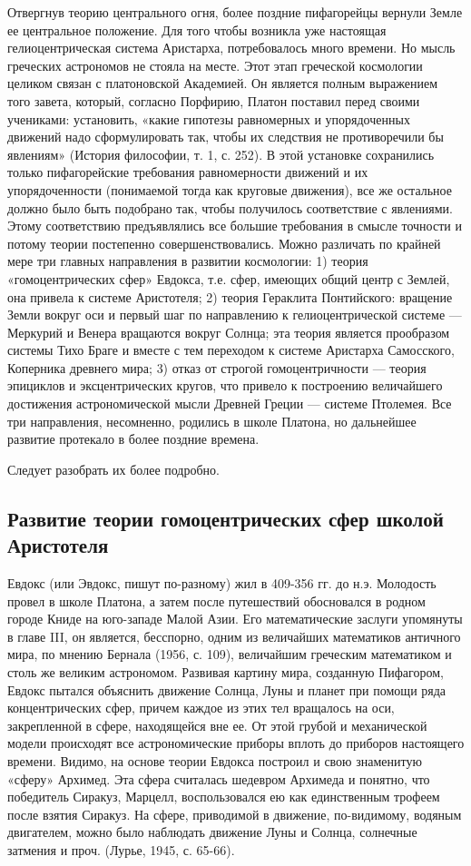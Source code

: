 Отвергнув теорию центрального огня, более поздние пифагорейцы вернули
Земле ее центральное положение. Для того чтобы возникла уже настоящая
гелиоцентрическая система Аристарха, потребовалось много времени. Но
мысль греческих астрономов не стояла на месте. Этот этап греческой
космологии целиком связан с платоновской Академией. Он является полным
выражением того завета, который, согласно Порфирию, Платон поставил
перед своими учениками: установить, «какие гипотезы равномерных и
упорядоченных движений надо сформулировать так, чтобы их следствия не
противоречили бы явлениям» (История философии, т. 1, с. 252). В этой
установке сохранились только пифагорейские требования равномерности
движений и их упорядоченности (понимаемой тогда как круговые
движения), все же остальное должно было быть подобрано так, чтобы
получилось соответствие с явлениями. Этому соответствию предъявлялись
все большие требования в смысле точности и потому теории постепенно
совершенствовались. Можно различать по крайней мере три главных
направления в развитии космологии: 1) теория «гомоцентрических сфер»
Евдокса, т.е. сфер, имеющих общий центр с Землей, она привела к
системе Аристотеля; 2) теория Гераклита Понтийского: вращение Земли
вокруг оси и первый шаг по направлению к гелиоцентрической системе ---
Меркурий и Венера вращаются вокруг Солнца; эта теория является
прообразом системы Тихо Браге и вместе с тем переходом к системе
Аристарха Самосского, Коперника древнего мира; 3) отказ от строгой
гомоцентричности --- теория эпициклов и эксцентрических кругов, что
привело к построению величайшего достижения астрономической мысли
Древней Греции --- системе Птолемея. Все три направления, несомненно,
родились в школе Платона, но дальнейшее развитие протекало в более
поздние времена.

Следует разобрать их более подробно.

\subsection{Развитие теории гомоцентрических сфер школой Аристотеля}

Евдокс (или Эвдокс, пишут по-разному) жил в 409-356 гг. до н.э.
Молодость провел в школе Платона, а затем после путешествий
обосновался в родном городе Книде на юго-западе Малой Азии. Его
математические заслуги упомянуты в главе III, он является, бесспорно,
одним из величайших математиков античного мира, по мнению Бернала
(1956, с. 109), величайшим греческим математиком и столь же великим
астрономом. Развивая картину мира, созданную Пифагором, Евдокс пытался
объяснить движение Солнца, Луны и планет при помощи ряда
концентрических сфер, причем каждое из этих тел вращалось на оси,
закрепленной в сфере, находящейся вне ее. От этой грубой и
механической модели происходят все астрономические приборы вплоть до
приборов настоящего времени. Видимо, на основе теории Евдокса построил
и свою знаменитую «сферу» Архимед. Эта сфера считалась шедевром
Архимеда и понятно, что победитель Сиракуз, Марцелл, воспользовался ею
как единственным трофеем после взятия Сиракуз. На сфере, приводимой в
движение, по-видимому, водяным двигателем, можно было наблюдать
движение Луны и Солнца, солнечные затмения и проч. (Лурье, 1945, с.
65-66).

